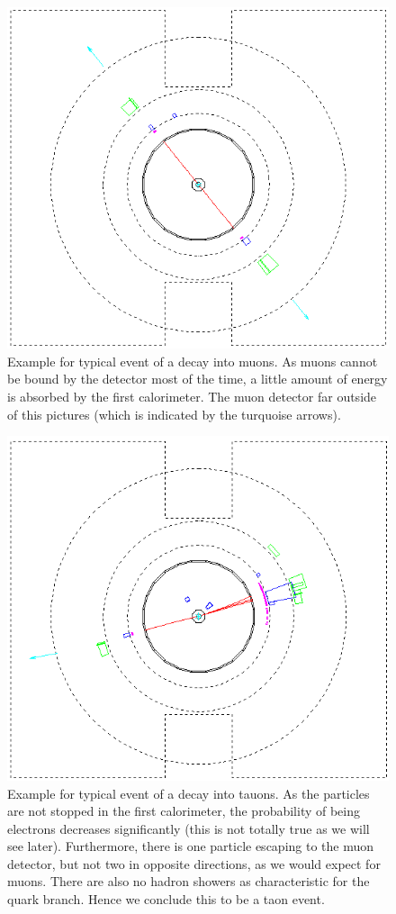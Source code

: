 \begin{figure}[htpb]
    \centering
    \includegraphics[width=0.8\linewidth]{figures/mm_02.png}
    \caption{Example for typical event of a decay into muons. As muons cannot be bound by the detector most of the time,
        a little amount of energy is absorbed by the first calorimeter. The muon detector far outside of this pictures (which
    is indicated by the turquoise arrows). }
\label{fig:mm}
\end{figure}

\begin{figure}[htpb]
    \centering
    \includegraphics[width=0.8\linewidth]{figures/tt_02.png}
    \caption{Example for typical event of a decay into tauons. As the particles are not
        stopped in the first calorimeter, the probability of being electrons decreases
        significantly (this is not totally true as we will see later). Furthermore,
        there is one particle escaping to the muon detector, but not two in opposite
        directions, as we would expect for muons. There are also no hadron showers
        as characteristic for the quark branch. Hence we conclude this to be a taon event. }
\label{fig:tt}
\end{figure}

